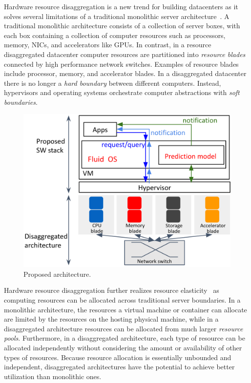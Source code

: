 Hardware resource disaggregation is a new trend for building
datacenters as it solves several limitations of a traditional monolithic
server architecture~\cite{Intel_RSA, HP_The_Machine, FB_disaggregated_rack,
chung2018towards, katrinis2016rack, asanovic2014firebox,
lim2009disaggregated, shan2018legoos}. A traditional
monolithic architecture consists of a collection of server boxes, with
each box containing a collection of computer resources such as processors,
memory, NICs, and accelerators like GPUs.
In contrast, in a resource disaggregated datacenter computer resources
are partitioned into \emph{resource blades} connected by high performance
network switches.
Examples of resource blades include processor, memory, and
accelerator blades.
In a disaggregated datacenter there is no longer a
\emph{hard boundary} between different computers.
Instead, hypervisors and operating systems orchestrate
computer abstractions with \emph{soft boundaries}.

\begin{figure}[]
     \centering
     \includegraphics[scale=0.15]{images/architecture.png}
     \caption{Proposed architecture.}
     \label{fig:archi}
\end{figure}

Hardware resource disaggregation further realizes resource
elasticity~\cite{herbst2013elasticity} as computing resources can
be allocated across traditional server boundaries.  In a monolithic
architecture, the resources a virtual machine or container can
allocate are limited by the resources on the hosting physical
machine, while in a disaggregated architecture resources can be
allocated from much larger \emph{resource pools}.  Furthermore, in
a disaggregated architecture, each type of resource can be allocated
independently without considering the amount or availability of
other types of resources.  Because resource allocation is essentially
unbounded and independent, disaggregated architectures have the
potential to achieve better utilization than monolithic ones.

